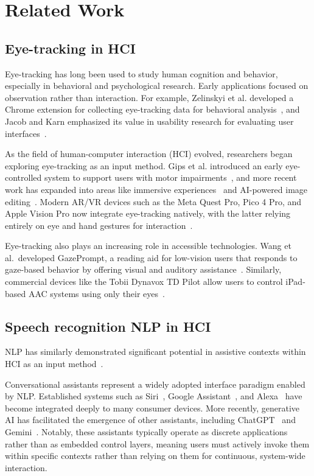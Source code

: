 
\section{Related Work}

\subsection{Eye-tracking in HCI}

Eye-tracking has long been used to study human cognition and behavior, especially in behavioral and psychological research. Early applications focused on observation rather than interaction. For example, Zelinskyi et al. developed a Chrome extension for collecting eye-tracking data for behavioral analysis~\cite{zelinskyi2024eyetracking}, and Jacob and Karn emphasized its value in usability research for evaluating user interfaces~\cite{jacob2003commentary}.

As the field of human-computer interaction (HCI) evolved, researchers began exploring eye-tracking as an input method. Gips et al. introduced an early eye-controlled system to support users with motor impairments~\cite{gips1996eagleeyes}, and more recent work has expanded into areas like immersive experiences~\cite{dondi2023gazehci} and AI-powered image editing~\cite{karlander2023ai}. Modern AR/VR devices such as the Meta Quest Pro, Pico 4 Pro, and Apple Vision Pro now integrate eye-tracking natively, with the latter relying entirely on eye and hand gestures for interaction~\cite{huang2024visionpro}.

Eye-tracking also plays an increasing role in accessible technologies. Wang et al.\ developed GazePrompt, a reading aid for low-vision users that responds to gaze-based behavior by offering visual and auditory assistance~\cite{wang2024gazeprompt}. Similarly, commercial devices like the Tobii Dynavox TD Pilot allow users to control iPad-based AAC systems using only their eyes~\cite{poster2025td}.

\subsection{Speech recognition NLP in HCI}

\ac{NLP} has similarly demonstrated significant potential in assistive contexts within HCI as an input method~\cite{song2024review}. 

Conversational assistants represent a widely adopted interface paradigm enabled by NLP. Established systems such as Siri~\cite{apple_siri}, Google Assistant~\cite{google_assistant}, and Alexa~\cite{amazon_alexa} have become integrated deeply to many consumer devices. More recently, generative AI has facilitated the emergence of other assistants, including ChatGPT~\cite{openai_chatgpt} and Gemini~\cite{google_gemini}. Notably, these assistants typically operate as discrete applications rather than as embedded control layers, meaning users must actively invoke them within specific contexts rather than relying on them for continuous, system-wide interaction.

